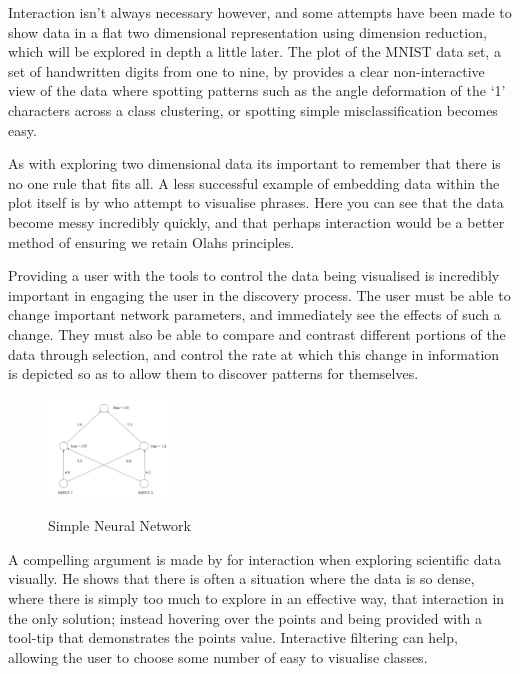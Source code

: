 \documentclass[a4paper,11pt,titlepage]{article}
\begin{document}
		Interaction isn't always necessary however, and some attempts have been made to show data in a flat two dimensional representation using dimension reduction, which will be explored in depth a little later. The plot of the MNIST data set, a set of handwritten digits from one to nine, by \cite{Maaten2008} provides a clear non-interactive view of the data where spotting patterns such as the angle deformation of the `1' characters across a class clustering, or spotting simple misclassification becomes easy.
		\par 
		As with exploring two dimensional data its important to remember that there is no one rule that fits all. A less successful example of embedding data within the plot itself is by \cite{Cho2014} who attempt to visualise phrases. Here you can see that the data become messy incredibly quickly, and that perhaps interaction would be a better method of ensuring we retain Olahs principles. 
		\par

		Providing a user with the tools to control the data being visualised is incredibly important in engaging the user in the discovery process. The user must be able to change important network parameters, and immediately see the effects of such a change. They must also be able to compare and contrast different portions of the data through selection, and control the rate at which this change in information is depicted so as to allow them to discover patterns for themselves. 
		\par 		
		 		
	\begin{figure}[H]
    			\centering	
			{{\includegraphics[width=0.3\textwidth]
    				{img/craven_simple_net.png} 
    			}}%
    			\caption{Simple Neural Network}%
    		\label{fig:simple}
	\end{figure} 		
 		
A compelling argument is made by  for interaction when exploring scientific data visually. He shows that there is often a situation where the data is so dense, where there is simply too much to explore in an effective way, that interaction in the only solution; instead hovering over the points and being provided with a tool-tip that demonstrates the points value. Interactive filtering can help, allowing the user to choose some number of easy to visualise classes. 
\end{document}
